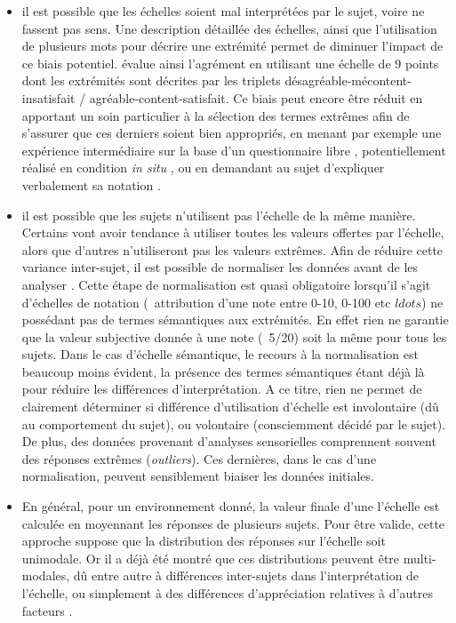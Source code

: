 \begin{itemize}
\item il est possible que les échelles soient mal interprétées par le sujet, voire ne fassent pas sens. Une description détaillée des échelles, ainsi que l'utilisation de plusieurs mots pour décrire une extrémité permet de diminuer l'impact de ce biais potentiel. \citep{hall2013exploratory} évalue ainsi l'agrément en utilisant une échelle de 9 points dont les extrémités sont décrites par les triplets désagréable-mécontent-insatisfait / agréable-content-satisfait. Ce biais peut encore être réduit en apportant un soin particulier à la sélection des termes extrêmes afin de s'assurer que ces derniers soient bien appropriés, en menant par exemple une expérience intermédiaire sur la base d'un questionnaire libre \citep{guastavino2004perceptual}, potentiellement réalisé en condition \emph{in situ} \citep{kang2010semantic,hong2013designing}, ou en demandant au sujet d'expliquer verbalement sa notation \citep{raimbault2006qualitative}. 
\item il est possible que les sujets n'utilisent pas l'échelle de la même manière. Certains vont avoir tendance à utiliser toutes les valeurs offertes par l'échelle, alors que d'autres n'utiliseront pas les valeurs extrêmes. Afin de réduire cette variance inter-sujet, il est possible de normaliser les données avant de les analyser \citep{defreville2004aactivity,lavandier2006contribution,nielbo2013investigating,hong2013designing}. Cette étape de normalisation est quasi obligatoire lorsqu'il s'agit d'échelles de notation (\eg~attribution d'une note entre 0-10, 0-100 etc $ldots$) ne possédant pas de termes sémantiques aux extrémités. En effet rien ne garantie que la valeur subjective donnée à une note (\eg~5/20) soit la même pour tous les sujets. Dans le cas d'échelle sémantique, le recours à la normalisation est beaucoup moins évident, la présence des termes sémantiques étant déjà là pour réduire les différences d'interprétation. A ce titre, rien ne permet de clairement déterminer si différence d'utilisation d'échelle est involontaire (dû au comportement du sujet), ou volontaire (consciemment décidé par le sujet).  De plus, des données provenant d'analyses sensorielles comprennent souvent des réponses extrêmes (\emph{outliers}). Ces dernières, dans le cas d'une normalisation, peuvent sensiblement biaiser les données initiales.
\item En général, pour un environnement donné, la valeur finale d'une l'échelle est calculée en moyennant les réponses de plusieurs sujets. Pour être valide, cette approche suppose que la distribution des réponses sur l'échelle soit unimodale. Or il a déjà été montré que ces distributions peuvent être multi-modales, dû entre autre à différences inter-sujets dans l'interprétation de l'échelle, ou simplement à des différences d'appréciation relatives à d'autres facteurs \citep{raimbault2006qualitative}. 
\end{itemize}

